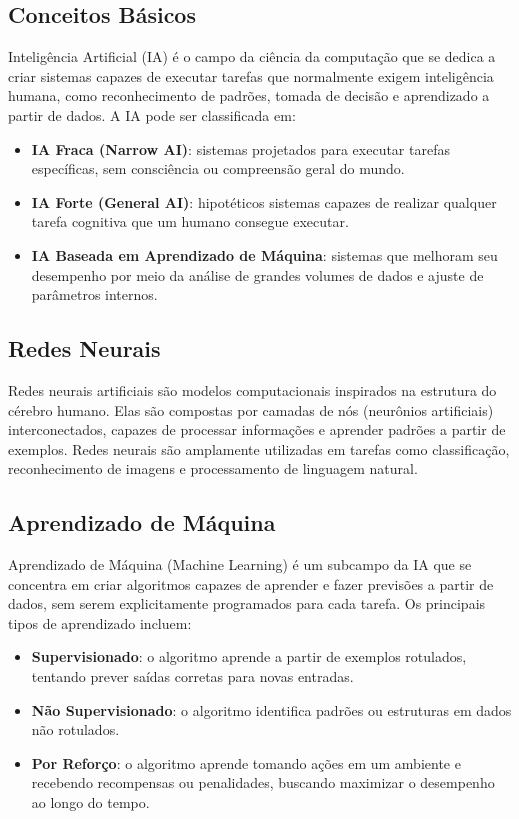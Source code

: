 \subsection{Conceitos Básicos}

Inteligência Artificial (IA) é o campo da ciência da computação que se dedica a criar sistemas capazes de executar tarefas que normalmente exigem inteligência humana, como reconhecimento de padrões, tomada de decisão e aprendizado a partir de dados. A IA pode ser classificada em:

\begin{itemize}
    \item \textbf{IA Fraca (Narrow AI)}: sistemas projetados para executar tarefas específicas, sem consciência ou compreensão geral do mundo.
    \item \textbf{IA Forte (General AI)}: hipotéticos sistemas capazes de realizar qualquer tarefa cognitiva que um humano consegue executar.
    \item \textbf{IA Baseada em Aprendizado de Máquina}: sistemas que melhoram seu desempenho por meio da análise de grandes volumes de dados e ajuste de parâmetros internos.
\end{itemize}

\subsection{Redes Neurais}

Redes neurais artificiais são modelos computacionais inspirados na estrutura do cérebro humano. Elas são compostas por camadas de nós (neurônios artificiais) interconectados, capazes de processar informações e aprender padrões a partir de exemplos. Redes neurais são amplamente utilizadas em tarefas como classificação, reconhecimento de imagens e processamento de linguagem natural.

\subsection{Aprendizado de Máquina}

Aprendizado de Máquina (Machine Learning) é um subcampo da IA que se concentra em criar algoritmos capazes de aprender e fazer previsões a partir de dados, sem serem explicitamente programados para cada tarefa. Os principais tipos de aprendizado incluem:

\begin{itemize}
    \item \textbf{Supervisionado}: o algoritmo aprende a partir de exemplos rotulados, tentando prever saídas corretas para novas entradas.
    \item \textbf{Não Supervisionado}: o algoritmo identifica padrões ou estruturas em dados não rotulados.
    \item \textbf{Por Reforço}: o algoritmo aprende tomando ações em um ambiente e recebendo recompensas ou penalidades, buscando maximizar o desempenho ao longo do tempo.
\end{itemize}

